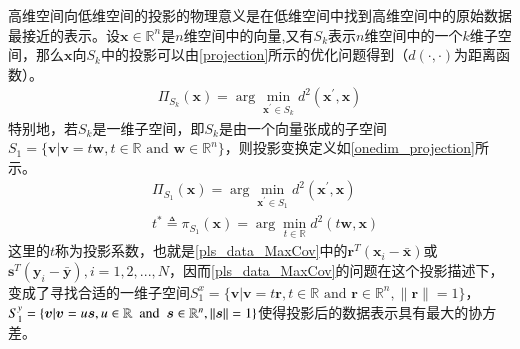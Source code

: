 高维空间向低维空间的投影的物理意义是在低维空间中找到高维空间中的原始数据最接近的表示。设$\bm{x} \in \mathbb{R}^{n}$是$n$维空间中的向量,又有$S_k$表示$n$维空间中的一个$k$维子空间，那么$\bm{x}$向$S_k$中的投影可以由\ref{projection}所示的优化问题得到（$d(\cdot,\cdot)$为距离函数）。
\begin{equation}
\label{projection}
\begin{split}
\Pi_{S_k}(\bm{x})=\arg\min_{\bm{x}^{\prime} \in S_k}d^{2}(\bm{x}^{\prime},\bm{x})
\end{split}
\end{equation}
特别地，若$S_k$是一维子空间，即$S_k$是由一个向量张成的子空间$S_1=\{\bm{v}|\bm{v}=t\bm{w},t\in \mathbb{R}\text{ and }\bm{w}\in\mathbb{R}^{n}\}$，则投影变换定义如\ref{onedim_projection}所示。
\begin{equation}
\label{onedim_projection}
\begin{split}
&\Pi_{S_1}(\bm{x})=\arg\min_{\bm{x}^{\prime} \in S_1}d^{2}(\bm{x}^{\prime},\bm{x})\\
&t^{*} \triangleq \pi_{S_1}(\bm{x})=\arg\min_{t\in\mathbb{R}}d^{2}(t\bm{w},\bm{x})
\end{split}
\end{equation}
这里的$t$称为投影系数，也就是\ref{pls_data_MaxCov}中的$\bm{r}^{T}(\bm{x}_{i}-\bar{\bm{x}})$或$\bm{s}^{T}(\bm{y}_{i}-\bar{\bm{y}}),i=1,2,...,N$，因而\ref{pls_data_MaxCov}的问题在这个投影描述下，变成了寻找合适的一维子空间$S_{1}^{x}=\{\bm{v}|\bm{v}=t\bm{r},t\in \mathbb{R}\text{ and }\bm{r}\in\mathbb{R}^{n},\|\bm{r}\|=1\}$，$S_{1}^{y}=\{\bm{v}|\bm{v}=u\bm{s},u\in \mathbb{R}~~{\rm and}~~\bm{s}\in\mathbb{R}^{n},\|\bm{s}\|=1\}$使得投影后的数据表示具有最大的协方差。
